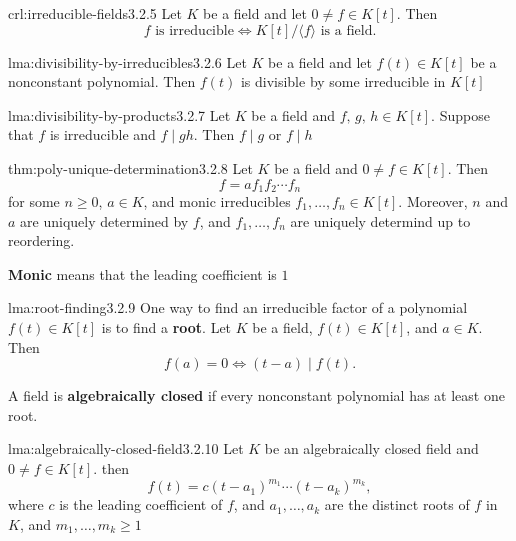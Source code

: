 \documentclass[landscape, 8pt]{extarticle}
\begin{document}
\begin{multicols}{3}
\begin{crl}{crl:irreducible-fields}{3.2.5}
    Let $K$ be a field and let $0 \ne f \in K[t]$. Then
    \[f \text{ is irreducible} \iff K[t] / \langle f \rangle \text{ is a field.}\]
\end{crl}

\begin{lma}{lma:divisibility-by-irreducibles}{3.2.6}
    Let $K$ be a field and let $f(t) \in K[t]$ be a nonconstant polynomial. Then $f(t)$ is divisible by some irreducible in $K[t]$
\end{lma}

\begin{lma}{lma:divisibility-by-products}{3.2.7}
    Let $K$ be a field and $f,\,g,\,h\in K[t]$. Suppose that $f$ is irreducible and $f \mid gh$. Then $f \mid g$ or $f \mid h$
\end{lma}

\begin{thm}{thm:poly-unique-determination}{3.2.8}
    Let $K$ be a field and $0 \ne f \in K[t]$. Then
    \[f = af_{1}f_{2}\cdots f_{n}\]
    for some $n \ge 0$, $a\in K$, and monic irreducibles $f_{1},\dots,f_{n}\in K[t]$. Moreover, $n$ and $a$ are uniquely determined by $f$, and $f_{1},\dots,f_{n}$ are uniquely determind up to reordering.

    \longrule{0.08ex}
    \textbf{Monic} means that the leading coefficient is $1$
\end{thm}

\begin{lma}{lma:root-finding}{3.2.9}
    One way to find an irreducible factor of a polynomial $f(t)\in K[t]$ is to find a \textbf{root}. Let $K$ be a field, $f(t) \in K[t]$, and $a\in K$. Then
    \[f(a) = 0 \iff (t - a) \mid f(t).\]

    \longrule{0.08ex}
    A field is \textbf{algebraically closed} if every nonconstant polynomial has at least one root.
\end{lma}

\begin{lma}{lma:algebraically-closed-field}{3.2.10}
    Let $K$ be an algebraically closed field and $0 \ne f \in K[t]$. then
    \[f(t) = c(t - a_{1})^{m_{1}} \cdots (t - a_{k})^{m_{k}},\]
    where $c$ is the leading coefficient of $f$, and $a_{1},\dots,a_{k}$ are the distinct roots of $f$ in $K$, and $m_{1},\dots,m_{k}\ge 1$
\end{lma}


\end{multicols}
\end{document}
